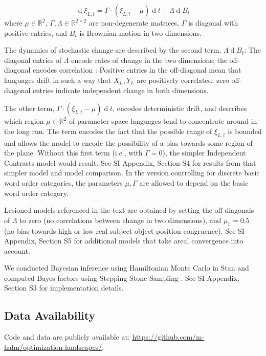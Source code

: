 \documentclass[9pt,twocolumn,twoside,lineno]{pnas-new}
\begin{document}
{\begin{equation*}
    \operatorname{d}\xi_{L,t} = \Gamma \cdot (\xi_{L,t}-\mu) \operatorname{d}t + \Lambda \operatorname{d}B_t
\end{equation*}
where $\mu \in \mathbb{R}^2$,  $\Gamma, \Lambda \in \mathbb{R}^{2\times 2}$ are non-degenerate matrices, $\Gamma$ is diagonal with positive entries, and $B_t$ is Brownian motion in two dimensions.

The dynamics of stochastic change are described by the second term, $\Lambda \operatorname{d}B_t$:
The diagonal entries of $\Lambda$ encode rates of change in the two dimensions; the off-diagonal encodes correlation \citep{felsenstein1973maximum,freckleton2012fast}: Positive entries in the off-diagonal mean that languages drift in such a way that $X_L, Y_L$ are positively correlated; zero off-diagonal entries indicate independent change in both dimensions.



The other term, $\Gamma \cdot (\xi_{L,t}-\mu) \operatorname{d}t$, encodes deterministic drift, and describes which region $\mu \in \mathbb{R}^2$ of parameter space languages tend to concentrate around in the long run.
The term encodes the fact that the possible range of $\xi_{L,t}$ is bounded and allows the model to encode the possibility of a bias towards some region of the plane.
Without this first term (i.e., with $\Gamma =0$), the simpler Independent Contrasts model \citep{felsenstein1973maximum,freckleton2012fast} would result. See SI Appendix, Section S4 for results from that simpler model and model comparison.
In the version controlling for discrete basic word order categories, the parameters $\mu, \Gamma$ are allowed to depend on the basic word order category.

Lesioned models referenced in the text are obtained by setting the off-diagonals of $\Lambda$ to zero (no correlations between change in two dimensions), and $\mu_1=0.5$ (no bias towards high or low real subject-object position congruence).
See SI Appendix, Section S5 for additional models that take areal convergence into account.


We conducted Bayesian inference using Hamiltonian Monte Carlo in Stan \citep{homan2014the,carpenter2017stan} and computed Bayes factors using Stepping Stone Sampling \citep{xie2011improving}.
See SI Appendix, Section S3 for implementation details.


	\subsection*{Data Availability} Code and data are publicly available at:
\url{https://github.com/m-hahn/optimization-landscapes/}.



}
\end{document}
